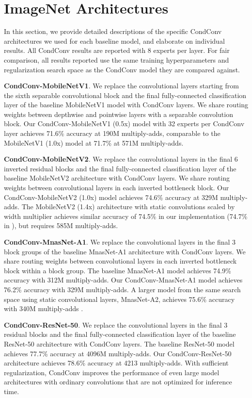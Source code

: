 \documentclass{article}
\def\codename{CondConv}
\begin{document}
\appendix
\appendixpage
\section{ImageNet Architectures}

In this section, we provide detailed descriptions of the specific \codename{} architectures we used for each baseline model, and elaborate on individual results. All \codename{} results are reported with 8 experts per layer. For fair comparison, all results reported use the same training hyperparameters and regularization search space as the \codename{} model they are compared against.

\textbf{\codename{}-MobileNetV1}. We replace the convolutional layers starting from the sixth separable convolutional block and the final fully-connected classification layer of the baseline MobileNetV1 model with \codename{} layers. We share routing weights between depthwise and pointwise layers with a separable convolution block. Our \codename{}-MobileNetV1 (0.5x) model with 32 experts per \codename{} layer achieves 71.6\% accuracy at 190M multiply-adds, comparable to the MobileNetV1 (1.0x) model at 71.7\% at 571M multiply-adds.

\textbf{\codename{}-MobileNetV2}. We replace the convolutional layers in the final 6 inverted residual blocks and the final fully-connected classification layer of the baseline MobileNetV2 architecture with \codename{} layers. We share routing weights between convolutional layers in each inverted bottleneck block. Our \codename{}-MobileNetV2 (1.0x) model achieves 74.6\% accuracy at 329M multiply-adds. The MobileNetV2 (1.4x) architecture with static convolutions scaled by width multiplier achieves similar accuracy of 74.5\% in our implementation (74.7\% in \cite{sandler2018mobilenetv2}), but requires 585M multiply-adds.

\textbf{\codename{}-MnasNet-A1}. We replace the convolutional layers in the final 3 block groups of the baseline MnasNet-A1 architecture with \codename{} layers. We share routing weights between convolutional layers in each inverted bottleneck block within a block group. The baseline MnasNet-A1 model achieves 74.9\% accuracy with 312M multiply-adds. Our \codename{}-MnasNet-A1 model achieves 76.2\% accuracy with 329M multiply-adds. A larger model from the same search space using static convolutional layers, MnasNet-A2, achieves 75.6\% accuracy with 340M multiply-adds \cite{tan2018mnasnet}.

\textbf{\codename{}-ResNet-50}. We replace the convolutional layers in the final 3 residual blocks and the final fully-connected classification layer of the baseline ResNet-50 architecture with \codename{} layers. The baseline ResNet-50 model achieves 77.7\% accuracy at 4096M multiply-adds. Our \codename{}-ResNet-50 architecture achieves 78.6\% accuracy at 4213 multiply-adds. With sufficient regularization, \codename{} improves the performance of even large model architectures with ordinary convolutions that are not optimized for inference time.
\end{document}
